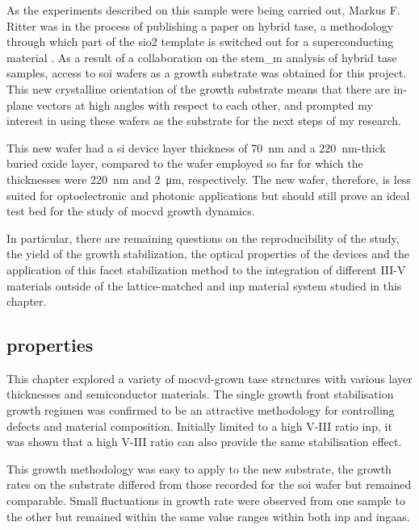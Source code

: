 As the experiments described on this sample were being carried out, Markus F. Ritter was in the process of publishing a paper on hybrid \acs{tase}, a methodology through which part of the \acs{sio2} template is switched out for a superconducting material \cite{Ritter2021}. As a result of a collaboration on the \acs{stem_m} analysis of hybrid \acs{tase} samples, access to \hkl[1 1 0] \acs{soi} wafers as a growth substrate was obtained for this project. This new crystalline orientation of the growth substrate means that there are in-plane  vectors at high angles with respect to each other, and prompted my interest in using these wafers as the substrate for the next steps of my research.

This new wafer had a \acs{si} device layer thickness of \qty{70}{\nano\metre} and a \qty{220}{\nano\metre}-thick buried oxide layer, compared to the \hkl[0 0 1] wafer employed so far for which the thicknesses were \qty{220}{\nano\metre} and \qty{2}{\micro\metre}, respectively. The new wafer, therefore, is less suited for optoelectronic and photonic applications but should still prove an ideal test bed for the study of \acs{mocvd} growth dynamics.

In particular, there are remaining questions on the reproducibility of the study, the yield of the growth stabilization, the optical properties of the devices and the application of this facet stabilization method to the integration of different III-V materials outside of the lattice-matched  and \acs{inp} material system \cite{Pearsall1980, Sugii1983, Wagner1970} studied in this chapter.

\subsection{properties}

This chapter explored a variety of \acs{mocvd}-grown \acs{tase} structures with various layer thicknesses and semiconductor materials. The  single growth front stabilisation growth regimen was confirmed to be an attractive methodology for controlling defects and material composition. Initially limited to a high V-III ratio \acs{inp}, it was shown that a high V-III ratio  can also provide the same  stabilisation effect. 

This growth methodology was easy to apply to the new substrate, the growth rates on the  substrate differed from those recorded for the  \acs{soi} wafer but remained comparable. Small fluctuations in growth rate were observed from one sample to the other but remained within the same value ranges within both \acs{inp} and \acs{ingaas}. 

